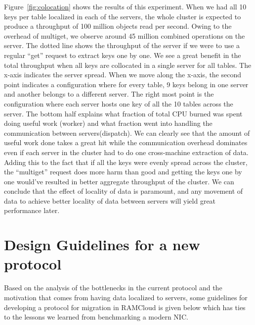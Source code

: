 Figure~\ref{fig:colocation} shows the results of this experiment. When we had all 10 keys per table localized in each of the servers, the whole cluster is expected to produce a throughput of 100 million objects read per second.
Owing to the overhead of multiget, we observe around 45 million combined operations on the server. The dotted line shows the throughput of the server if we were to use a regular ``get'' request to extract keys one by one.
We see a great benefit in the total throughput when all keys are collocated in a single server for all tables. The x-axis indicates the server spread. When we move along the x-axis, the second point indicates a configuration where for every table, 9 keys belong in one server and 
another belongs to a different server. The right most point is the configuration where each server hosts one key of all the 10 tables across the server. The bottom half explains what fraction of total CPU burned was spent 
doing useful work (worker) and what fraction went into handling the communication between servers(dispatch). 
We can clearly see that the amount of useful work done takes a great hit while the communication overhead dominates 
even if each server in the cluster had to do one cross-machine extraction of data. Adding this to the fact that if all the keys were evenly spread across the cluster, the ``multiget'' request does more harm than good and getting the 
keys one by one would've resulted in better aggregate throughput of the cluster. We can conclude that the effect of locality of data is paramount, and any movement of data to achieve better locality of data between servers will yield 
great performance later.
\section{Design Guidelines for a new protocol}
Based on the analysis of the bottlenecks in the current protocol and the motivation that comes from having data localized to servers, some guidelines for developing a protocol for migration in RAMCloud
is given below which has ties to the lessons we learned from benchmarking a modern NIC.

